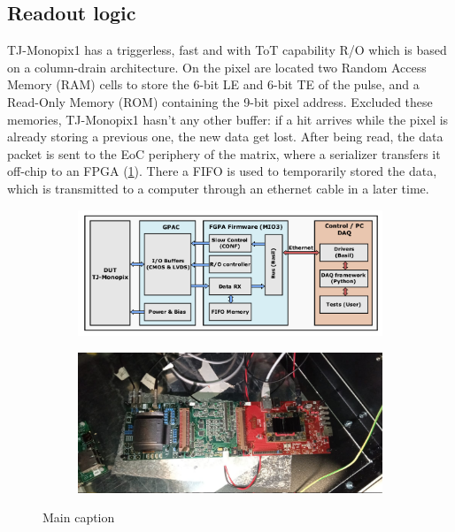 \subsection{Readout logic}\label{chap:Monopix_RO}
    TJ-Monopix1 has a triggerless, fast and with ToT capability R/O which is based on a column-drain architecture.      
    On the pixel are located two Random Access Memory (RAM) cells to store the 6-bit LE and 6-bit TE of the pulse, and a Read-Only Memory (ROM) containing the 9-bit pixel address. Excluded these memories, TJ-Monopix1 hasn't any other buffer: if a hit arrives while the pixel is already storing a previous one, the new data get lost.  
    After being read, the data packet is sent to the EoC periphery of the matrix, where a serializer transfers it off-chip to an FPGA (\ref{fig:R/O-system}). There a FIFO is used to temporarily stored the data, which is transmitted to a computer through an ethernet cable in a later time.  
    \begin{figure}
        \begin{subfigure}{\textwidth}
        \centering
        \includegraphics[clip,width=0.8\linewidth]{figures/Monopix1/schematic_boards.png}
        \end{subfigure}
        \bigskip
        \begin{subfigure}{\textwidth}
        \centering    
        \includegraphics[clip,width=0.8\linewidth]{figures/Monopix1/monopix1_front.jpeg}
        \end{subfigure}
        \caption{Main caption}
        \label{fig:R/O-system}
    \end{figure}


